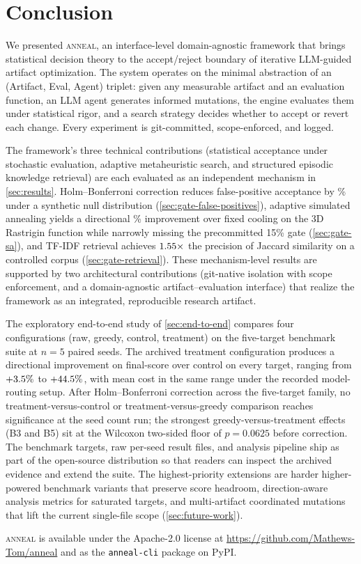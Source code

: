 \section{Conclusion}
\label{sec:conclusion}

We presented \textsc{anneal}, an interface-level domain-agnostic framework that brings statistical decision theory to the accept/reject boundary of iterative LLM-guided artifact optimization.
The system operates on the minimal abstraction of an (Artifact, Eval, Agent) triplet: given any measurable artifact and an evaluation function, an LLM agent generates informed mutations, the engine evaluates them under statistical rigor, and a search strategy decides whether to accept or revert each change.
Every experiment is git-committed, scope-enforced, and logged.

The framework's three technical contributions (statistical acceptance under stochastic evaluation, adaptive metaheuristic search, and structured episodic knowledge retrieval) are each evaluated as an independent mechanism in \cref{sec:results}.
Holm--Bonferroni correction reduces false-positive acceptance by \fpReductionPct\% under a synthetic null distribution (\cref{sec:gate-false-positives}), adaptive simulated annealing yields a directional \saImprovementPct\% improvement over fixed cooling on the 3D Rastrigin function while narrowly missing the precommitted 15\% gate (\cref{sec:gate-sa}), and TF-IDF retrieval achieves $1.55\times$ the precision of Jaccard similarity on a controlled corpus (\cref{sec:gate-retrieval}).
These mechanism-level results are supported by two architectural contributions (git-native isolation with scope enforcement, and a domain-agnostic artifact--evaluation interface) that realize the framework as an integrated, reproducible research artifact.

The exploratory end-to-end study of \cref{sec:end-to-end} compares four configurations (raw, greedy, control, treatment) on the five-target benchmark suite at $n = 5$ paired seeds.
The archived treatment configuration produces a directional improvement on final-score over control on every target, ranging from $+3.5\%$ to $+44.5\%$, with mean cost in the same range under the recorded model-routing setup.
After Holm--Bonferroni correction across the five-target family, no treatment-versus-control or treatment-versus-greedy comparison reaches significance at the seed count run; the strongest greedy-versus-treatment effects (B3 and B5) sit at the Wilcoxon two-sided floor of $p = 0.0625$ before correction.
The benchmark targets, raw per-seed result files, and analysis pipeline ship as part of the open-source distribution so that readers can inspect the archived evidence and extend the suite.
The highest-priority extensions are harder higher-powered benchmark variants that preserve score headroom, direction-aware analysis metrics for saturated targets, and multi-artifact coordinated mutations that lift the current single-file scope (\cref{sec:future-work}).

\textsc{anneal} is available under the Apache-2.0 license at \url{https://github.com/Mathews-Tom/anneal} and as the \texttt{anneal-cli} package on PyPI.
